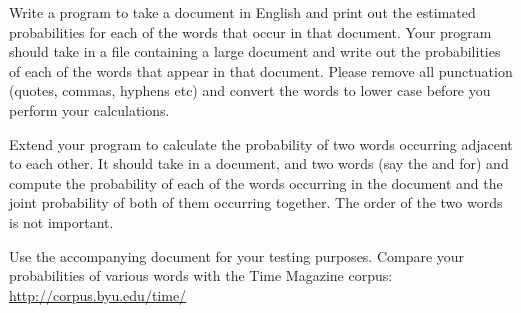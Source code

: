 \documentclass[]{article}
\begin{document}
Write a program to take a document in English and print out the
estimated probabilities for each of the words that occur in that
document. Your program should take in a file containing a large document
and write out the probabilities of each of the words that appear in that
document. Please remove all punctuation (quotes, commas, hyphens etc)
and convert the words to lower case before you perform your
calculations.

Extend your program to calculate the probability of two words occurring
adjacent to each other. It should take in a document, and two words (say
the and for) and compute the probability of each of the words occurring
in the document and the joint probability of both of them occurring
together. The order of the two words is not important.

Use the accompanying document for your testing purposes. Compare your
probabilities of various words with the Time Magazine corpus:
\url{http://corpus.byu.edu/time/}
\end{document}
